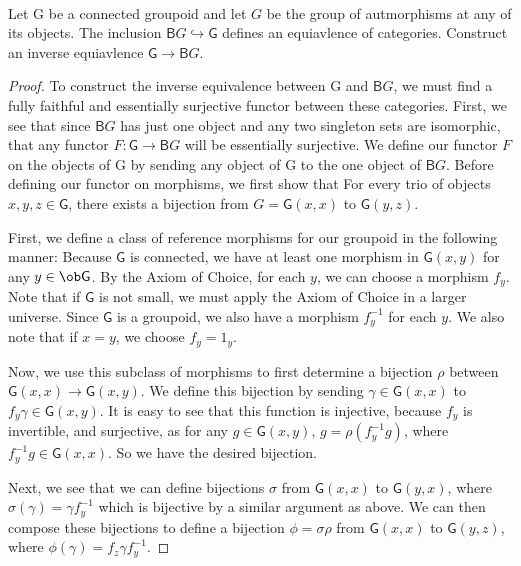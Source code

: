 \documentclass[main.tex]{subfiles}
\begin{document}
\paragraph{}
\begin{exercise}
	Let \textsf{G} be a connected groupoid and let $G$ be
	the group of autmorphisms at any of its objects. The inclusion $\textsf{B}G
	\hookrightarrow \textsf{G}$ defines an equiavlence of categories. Construct an
	inverse equiavlence $\textsf{G} \rightarrow \textsf{B}G$.
\end{exercise}
\begin{proof}
	To construct the inverse equivalence between  \textsf{G} and $\textsf{B}G$,
	we must find a fully faithful and essentially surjective functor between
	these categories. First, we see that since $\textsf{B}G$ has just one
	object and any two singleton sets are isomorphic, that any functor $F\colon \textsf{G} \rightarrow \textsf{B}G$ will be
	essentially surjective. We define our functor $F$ on the objects of
	\textsf{G} by sending any object of \textsf{G} to the one object of
	$\textsf{B}G$. Before defining our functor on morphisms, we first show that
	For every trio of objects $x,y,z \in \textsf{G}$, there exists a bijection
	from $G = \textsf{G}(x,x) $ to $\textsf{G}(y,z)$.

	First, we define a class of reference morphisms for our groupoid in the
	following manner: Because $\textsf{G}$ is connected, we have at least one
	morphism in $\textsf{G} (x,y)$ for any $y \in \ob\textsf{G}$. By the Axiom of
	Choice, for each $y$, we can choose a morphism $f_y$. Note that if
	$\textsf{G}$ is not small, we must apply the Axiom of Choice in a larger
	universe. Since $\textsf{G}$ is a groupoid, we also have a morphism
	$f_y^{-1}$ for each $y$. We also note that if $x = y$, we choose $f_y =
	1_y$.

	Now, we use this subclass of morphisms to first determine a bijection $\rho$
	between $\textsf{G}(x,x) \rightarrow \textsf{G}(x,y)$. We define this
	bijection by sending $\gamma \in \textsf{G}(x,x)$ to $f_y\gamma \in
	\textsf{G}(x,y)$. It is easy to see that this function is injective, because
	$f_y$ is invertible, and surjective, as for any $g \in \textsf{G}(x,y)$, $g
	= \rho(f_y^{-1}g)$, where $f_y^{-1}g \in \textsf{G}(x,x)$. So we have the
	desired bijection.

	Next, we see that we can define bijections  $\sigma$ from $\textsf{G}(x,x)$
	to $\textsf{G}(y,x)$, where $\sigma(\gamma) = \gamma f_y^{-1}$ which is
	bijective by a similar argument as above. We can then compose these
	bijections to define a bijection $\phi = \sigma\rho$ from $\textsf{G}(x,x)$
	to $\textsf{G}(y,z)$, where $\phi(\gamma) = f_z\gamma f_y^{-1}$.


\end{proof}
\end{document}
